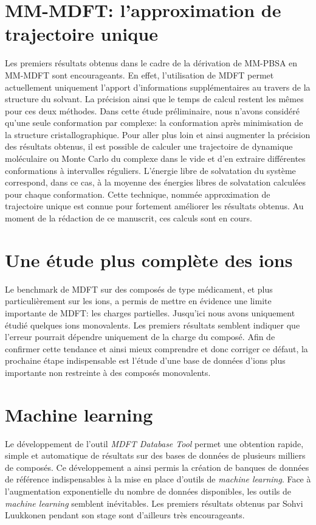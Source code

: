 \section{MM-MDFT: l'approximation de trajectoire unique}
Les premiers résultats obtenus dans le cadre de la dérivation de MM-PBSA en MM-MDFT sont encourageants. En effet, l'utilisation de MDFT permet actuellement uniquement l'apport d'informations supplémentaires au travers de la structure du solvant. La précision ainsi que le temps de calcul restent les mêmes pour ces deux méthodes. Dans cette étude préliminaire, nous n'avons considéré qu'une seule conformation par complexe: la conformation après minimisation de la structure cristallographique. Pour aller plus loin et ainsi augmenter la précision des résultats obtenus, il est possible de calculer une trajectoire de dynamique moléculaire ou Monte Carlo du complexe dans le vide et d'en extraire différentes conformations à intervalles réguliers. L'énergie libre de solvatation du système correspond, dans ce cas, à la moyenne des énergies libres de solvatation calculées pour chaque conformation. Cette technique, nommée approximation de trajectoire unique est connue pour fortement améliorer les résultats obtenus. Au moment de la rédaction de ce manuscrit, ces calculs sont en cours.

\section{Une étude plus complète des ions}
Le benchmark de MDFT sur des composés de type médicament, et plus particulièrement sur les ions, a permis de mettre en évidence une limite importante de MDFT: les charges partielles. Jusqu'ici nous avons uniquement étudié quelques ions monovalents. Les premiers résultats semblent indiquer que l'erreur pourrait dépendre uniquement de la charge du composé. Afin de confirmer cette tendance et ainsi mieux comprendre et donc corriger ce défaut, la prochaine étape indispensable est l'étude d'une base de données d'ions plus importante non restreinte à des composés monovalents.

\section{Machine learning}
Le développement de l'outil \textit{MDFT Database Tool} permet une obtention rapide, simple et automatique de résultats sur des bases de données de plusieurs milliers de composés. Ce développement a ainsi permis la création de banques de données de référence indispensables à la mise en place d'outils de \textit{machine learning}. Face à l'augmentation exponentielle du nombre de données disponibles, les outils de \textit{machine learning} semblent inévitables. Les premiers résultats obtenus par Sohvi Luukkonen pendant son stage sont d'ailleurs très encourageants.

